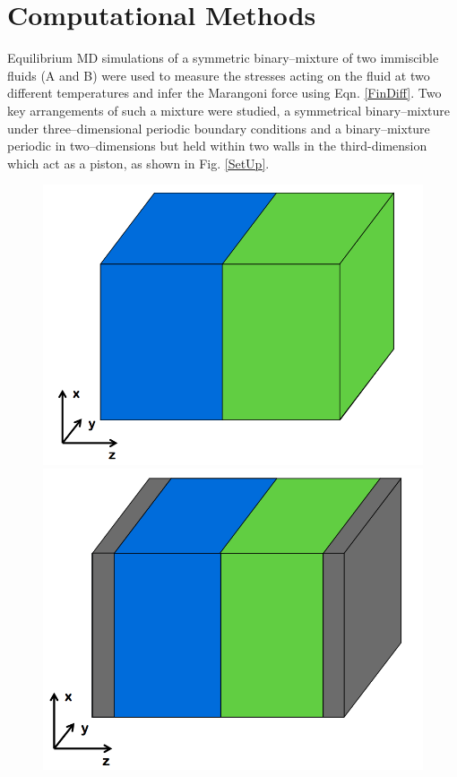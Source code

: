 \section{Computational Methods}

Equilibrium MD simulations of a symmetric binary--mixture of two immiscible fluids (A and B) were used to measure the stresses acting on the fluid at two different temperatures and infer the Marangoni force using Eqn. \ref{FinDiff}.
Two key arrangements of such a mixture were studied, a symmetrical binary–mixture under three--dimensional periodic boundary conditions and a binary--mixture periodic in two--dimensions but held within two walls in the third-dimension which act as a piston, as shown in Fig. \ref{SetUp}.

\begin{figure}[h]
        \includegraphics[scale=0.25]{AABB.png}
        \includegraphics[scale=0.25]{AABB_piston.png}

\end{figure}

